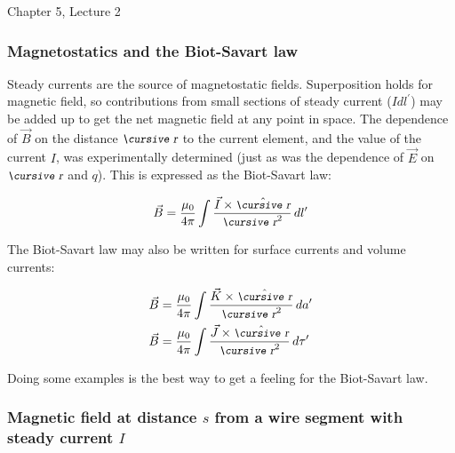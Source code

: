 \documentclass[12pt]{article}
\begin{document}
\begin{flushright} {\color{blue} Chapter 5, Lecture 2} \end{flushright}
\begin{flushleft}

\subsubsection*{\bf \color{myblue} Magnetostatics and the Biot-Savart law}

Steady currents are the source of magnetostatic fields.  Superposition holds for magnetic field, so contributions from small sections of steady current ($Idl^{\prime}$) may be added up to get the net magnetic field at any point in space.  The dependence of $\vec{B}$ on the distance $\text{\small\slshape\cursive r}$ to the current element, and the value of the current $I$, was experimentally determined (just as was the dependence of $\vec{E}$ on $\text{\small\slshape\cursive r}$ and $q$).  This is expressed as the Biot-Savart law:

\begin{equation}
\vec{B}  = \frac{ \mu_{0} }{4\pi} \int \frac{ \vec{I} \times  \hat{\text{\small\slshape\cursive r}}}{\text{\small\slshape\cursive r}^{2}} \,  dl^{\prime} 
\label{eq:biotsavart}
\end{equation}

The Biot-Savart law may also be written for surface currents and volume currents:

\begin{equation*}
\begin{aligned}
&   \vec{B}  = \frac{ \mu_{0} }{4\pi} \int \frac{ \vec{K} \times  \hat{\text{\small\slshape\cursive r}}}{\text{\small\slshape\cursive r}^{2}} \,  da^{\prime} \\ 
&   \vec{B}  = \frac{ \mu_{0} }{4\pi} \int \frac{ \vec{J} \times  \hat{\text{\small\slshape\cursive r}}}{\text{\small\slshape\cursive r}^{2}} \,  d\tau^{\prime}
\end{aligned}
\end{equation*}

\vspace{.1in}
Doing some examples is the best way to get a feeling for the Biot-Savart law.

\vspace{.2in}
{\color{mygreen} \hrulefill}
\vspace{-.2in}
\subsubsection*{\bf Magnetic field at distance $s$ from a wire segment with steady current $I$}


\end{flushleft}
\end{document}
